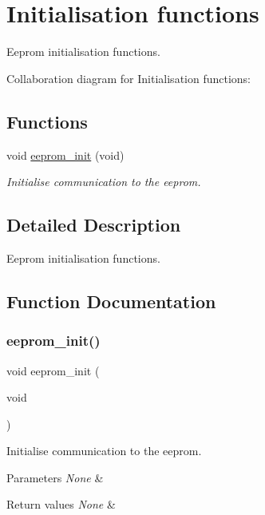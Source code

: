\hypertarget{group___eeprom___init}{}\section{Initialisation functions}
\label{group___eeprom___init}


Eeprom initialisation functions.  


Collaboration diagram for Initialisation functions\+:
\subsection*{Functions}
\begin{DoxyCompactItemize}
\item 
void \hyperlink{group___eeprom___init_ga4ec7f9d780da432051aa74ec5892a94c}{eeprom\+\_\+init} (void)
\begin{DoxyCompactList}\small\item\em Initialise communication to the eeprom. \end{DoxyCompactList}\end{DoxyCompactItemize}


\subsection{Detailed Description}
Eeprom initialisation functions. 



\subsection{Function Documentation}
\mbox{\label{group___eeprom___init_ga4ec7f9d780da432051aa74ec5892a94c}} 
\subsubsection{\texorpdfstring{eeprom\+\_\+init()}{eeprom\_init()}}
{\footnotesize\ttfamily void eeprom\+\_\+init (\begin{DoxyParamCaption}\item[{void}]{ }\end{DoxyParamCaption})}



Initialise communication to the eeprom. 


\begin{DoxyParams}{Parameters}
{\em None} & \\
\hline
\end{DoxyParams}

\begin{DoxyRetVals}{Return values}
{\em None} & \\
\hline
\end{DoxyRetVals}
